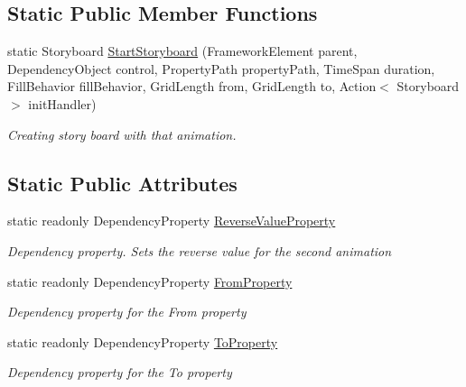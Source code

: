 \subsection*{Static Public Member Functions}
\begin{DoxyCompactItemize}
\item 
static Storyboard \mbox{\hyperlink{class_wpf_handler_1_1_u_i_1_1_animations_1_1_grid_length_animation_a7ad925b0243e7b71b3aa51dcf5fd1bae}{Start\+Storyboard}} (Framework\+Element parent, Dependency\+Object control, Property\+Path property\+Path, Time\+Span duration, Fill\+Behavior fill\+Behavior, Grid\+Length from, Grid\+Length to, Action$<$ Storyboard $>$ init\+Handler)
\begin{DoxyCompactList}\small\item\em Creating story board with that animation. \end{DoxyCompactList}\end{DoxyCompactItemize}
\subsection*{Static Public Attributes}
\begin{DoxyCompactItemize}
\item 
static readonly Dependency\+Property \mbox{\hyperlink{class_wpf_handler_1_1_u_i_1_1_animations_1_1_grid_length_animation_a1f22e25ed15efee7758a5c1cdbe97965}{Reverse\+Value\+Property}}
\begin{DoxyCompactList}\small\item\em Dependency property. Sets the reverse value for the second animation \end{DoxyCompactList}\item 
static readonly Dependency\+Property \mbox{\hyperlink{class_wpf_handler_1_1_u_i_1_1_animations_1_1_grid_length_animation_a6950b177c05db4b6cab2705c1081c610}{From\+Property}}
\begin{DoxyCompactList}\small\item\em Dependency property for the From property \end{DoxyCompactList}\item 
static readonly Dependency\+Property \mbox{\hyperlink{class_wpf_handler_1_1_u_i_1_1_animations_1_1_grid_length_animation_ad46e81c2929885dacbff706b3c860146}{To\+Property}}
\begin{DoxyCompactList}\small\item\em Dependency property for the To property \end{DoxyCompactList}\end{DoxyCompactItemize}
